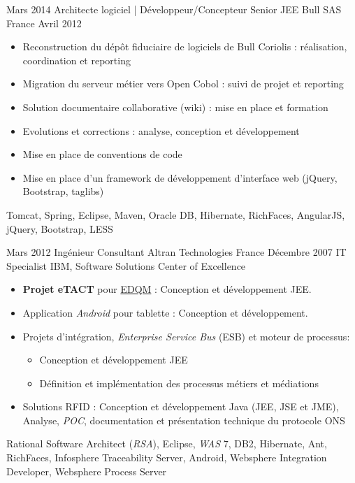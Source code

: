 \begin{experiences}
  \emptySeparator

  \experience
  {Mars 2014}
  {Architecte logiciel | Développeur/Concepteur Senior JEE}
  {Bull SAS}
  {France}
  {Avril 2012}
  {
    \begin{itemize}
      \item Reconstruction du dépôt fiduciaire de logiciels de Bull Coriolis :
            réalisation, coordination et reporting
      \item Migration du serveur métier vers Open Cobol : suivi de projet et
            reporting
      \item Solution documentaire collaborative (wiki) : mise en place et
            formation
      \item Evolutions et corrections : analyse, conception et développement
      \item Mise en place de conventions de code
      \item Mise en place d'un framework de développement d'interface web
            (jQuery, Bootstrap, taglibs)
    \end{itemize}
  }
  {
    Tomcat,
    Spring,
    Eclipse,
    Maven,
    Oracle DB,
    Hibernate,
    RichFaces,
    AngularJS,
    jQuery,
    Bootstrap,
    LESS
  }

  \emptySeparator

  \consultantexperience
  {Mars 2012}
  {Ingénieur Consultant}
  {Altran Technologies}
  {France}
  {Décembre 2007}
  {IT Specialist}
  {IBM, Software Solutions Center of Excellence}
  {
    \begin{itemize}
      \item \textbf{Projet eTACT} pour
            \href{https://www.edqm.eu/fr/contexte-mission-cd-p-phcmed.html}{EDQM} :
            Conception et développement JEE.
      \item Application \emph{Android} pour tablette : Conception et
            développement.
      \item Projets d'intégration, \emph{Enterprise Service Bus} (ESB) et moteur
            de processus:
            \begin{itemize}
              \item Conception et développement JEE
              \item Définition et implémentation des processus métiers et
                    médiations
            \end{itemize}
      \item Solutions RFID : Conception et développement Java (JEE, JSE et JME),
            Analyse, \emph{POC}, documentation et présentation technique du protocole
            ONS
    \end{itemize}
  }
  {
    Rational Software Architect (\emph{RSA}),
    Eclipse,
    \emph{WAS} 7,
    DB2,
    Hibernate,
    Ant,
    RichFaces,
    Infosphere Traceability Server,
    Android,
    Websphere Integration Developer,
    Websphere Process Server
  }


\end{experiences}
